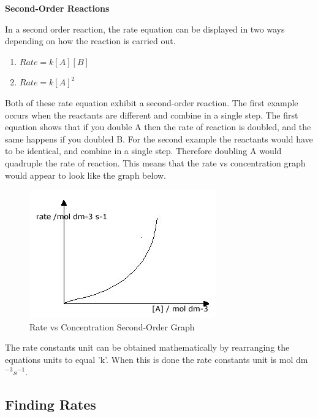 \textbf{Second-Order Reactions}

In a second order reaction, the rate equation can be displayed in two ways depending on how the reaction is carried out.

\begin{enumerate}
\item $Rate = k[A] [B]$
\item $Rate = k[A]^2$
\end{enumerate}

Both of these rate equation exhibit a second-order reaction. The first example occurs when the reactants are different and combine in a single step. The first equation shows that if you double A then the rate of reaction is doubled, and the same happens if you doubled B. For the second example the reactants would have to be identical, and combine in a single step. Therefore doubling A would quadruple the rate of reaction. This means that the rate vs concentration graph would appear to look like the graph below.

\begin{figure}[H]
    \includegraphics[width=\textwidth]{./Planning/Images/SecondOrder.jpg}
    \caption{ Rate vs Concentration Second-Order Graph} \label{fig:Second Order Graph}
\end{figure}

The rate constants unit can be obtained mathematically by rearranging the equations units to equal 'k'. When this is done the rate constants unit is mol dm$^{-3} s^{-1}$.







	\subsection{Finding Rates}


